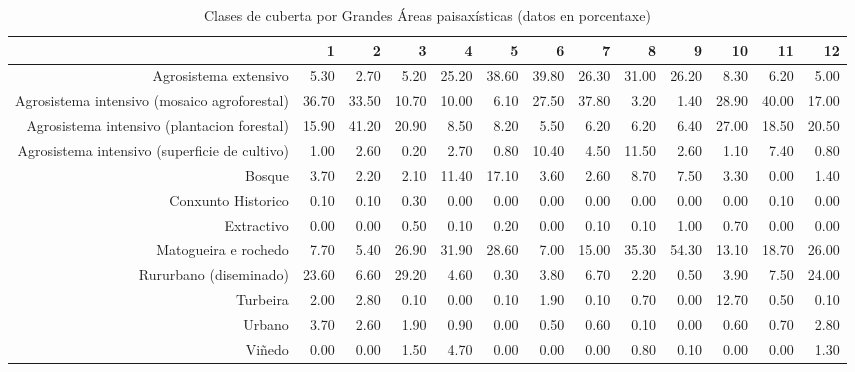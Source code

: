 \begin{table}[p]
\centering
\caption{Clases de cuberta por Grandes Áreas paisaxísticas (datos en porcentaxe)} 
\label{xtaboa2p}
\begin{tabular}{rrrrrrrrrrrrr}
  \hline
 & 1 & 2 & 3 & 4 & 5 & 6 & 7 & 8 & 9 & 10 & 11 & 12 \\ 
  \hline
Agrosistema extensivo & 5.30 & 2.70 & 5.20 & 25.20 & 38.60 & 39.80 & 26.30 & 31.00 & 26.20 & 8.30 & 6.20 & 5.00 \\ 
  Agrosistema intensivo (mosaico agroforestal) & 36.70 & 33.50 & 10.70 & 10.00 & 6.10 & 27.50 & 37.80 & 3.20 & 1.40 & 28.90 & 40.00 & 17.00 \\ 
  Agrosistema intensivo (plantacion forestal) & 15.90 & 41.20 & 20.90 & 8.50 & 8.20 & 5.50 & 6.20 & 6.20 & 6.40 & 27.00 & 18.50 & 20.50 \\ 
  Agrosistema intensivo (superficie de cultivo) & 1.00 & 2.60 & 0.20 & 2.70 & 0.80 & 10.40 & 4.50 & 11.50 & 2.60 & 1.10 & 7.40 & 0.80 \\ 
  Bosque & 3.70 & 2.20 & 2.10 & 11.40 & 17.10 & 3.60 & 2.60 & 8.70 & 7.50 & 3.30 & 0.00 & 1.40 \\ 
  Conxunto Historico & 0.10 & 0.10 & 0.30 & 0.00 & 0.00 & 0.00 & 0.00 & 0.00 & 0.00 & 0.00 & 0.10 & 0.00 \\ 
  Extractivo & 0.00 & 0.00 & 0.50 & 0.10 & 0.20 & 0.00 & 0.10 & 0.10 & 1.00 & 0.70 & 0.00 & 0.00 \\ 
  Matogueira e rochedo & 7.70 & 5.40 & 26.90 & 31.90 & 28.60 & 7.00 & 15.00 & 35.30 & 54.30 & 13.10 & 18.70 & 26.00 \\ 
  Rururbano (diseminado) & 23.60 & 6.60 & 29.20 & 4.60 & 0.30 & 3.80 & 6.70 & 2.20 & 0.50 & 3.90 & 7.50 & 24.00 \\ 
  Turbeira & 2.00 & 2.80 & 0.10 & 0.00 & 0.10 & 1.90 & 0.10 & 0.70 & 0.00 & 12.70 & 0.50 & 0.10 \\ 
  Urbano & 3.70 & 2.60 & 1.90 & 0.90 & 0.00 & 0.50 & 0.60 & 0.10 & 0.00 & 0.60 & 0.70 & 2.80 \\ 
  Viñedo & 0.00 & 0.00 & 1.50 & 4.70 & 0.00 & 0.00 & 0.00 & 0.80 & 0.10 & 0.00 & 0.00 & 1.30 \\ 
   \hline
\end{tabular}
\end{table}
